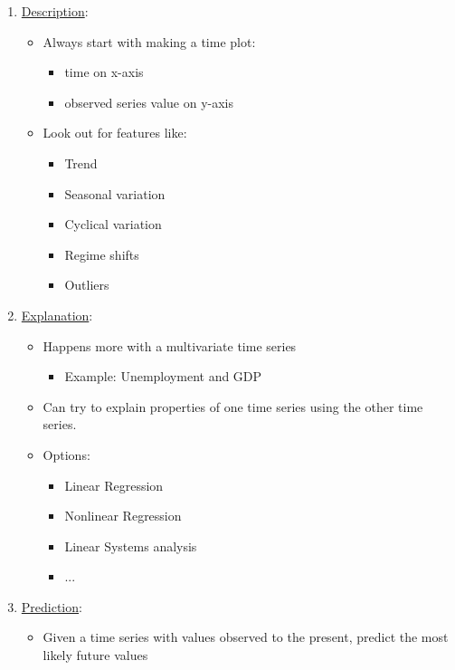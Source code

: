 \begin{enumerate}[label=\Alph*.]
    \item \underline{Description}: 
    \begin{itemize}
        \item Always start with making a time plot:
        \begin{itemize}
            \item time on x-axis 
            \item observed series value on y-axis
        \end{itemize}
        \item Look out for features like:
        \begin{itemize}
            \item Trend
            \item Seasonal variation
            \item Cyclical variation
            \item Regime shifts
            \item Outliers
        \end{itemize}
    \end{itemize}
    \item \underline{Explanation}:
    \begin{itemize}
        \item Happens more with a multivariate time series
        \begin{itemize}
            \item Example: \quad Unemployment and GDP
        \end{itemize}
        \item Can try to explain properties of one time series using the other time series.
        \item Options:
        \begin{itemize}
            \item Linear Regression
            \item Nonlinear Regression
            \item Linear Systems analysis
            \item ...
        \end{itemize}
    \end{itemize}
    \item \underline{Prediction}:
    \begin{itemize}
        \item Given a time series with values observed to the present, predict the most likely future values

\end{itemize}
\end{enumerate}

